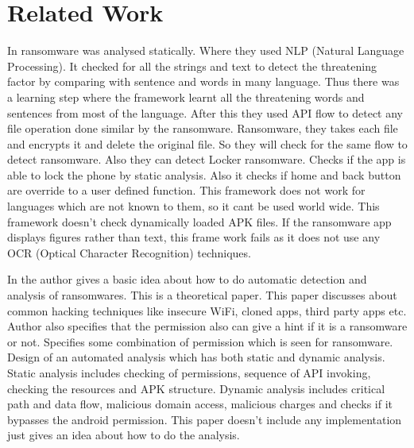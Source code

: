 \chapter{Related Work}


\par In \cite{andronio2015} ransomware was analysed statically. 
Where they used NLP (Natural Language Processing). 
It checked for all the strings and text to detect the threatening factor by comparing with sentence and words in many language. 
Thus there was a learning step where the framework learnt all the threatening words and sentences from most of the language. 
After this they used API flow to detect any file operation done similar by the ransomware. 
Ransomware, they takes each file and encrypts it and delete the original file. 
So they will check for the same flow to detect ransomware. 
Also they can detect Locker ransomware. 
Checks if the app is able to lock the phone by static analysis. 
Also it checks if home and back button are override to a user defined function. 
This framework does not work for languages which are not known to them, so it cant be used world wide. 
This framework doesn't check dynamically loaded APK files. 
If the ransomware app displays figures rather than text, this frame work fails as it does not use any OCR (Optical Character Recognition) techniques.


\par In \cite{yang2015} the author gives a basic idea about how to do automatic detection and analysis of ransomwares. 
This is a theoretical paper. 
This paper discusses about common hacking techniques like insecure WiFi, cloned apps, third party apps etc. 
Author also specifies that the permission also can give a hint if it is a ransomware or not. 
Specifies some combination of permission which is seen for ransomware. 
Design of an automated analysis which has both static and dynamic analysis. 
Static analysis includes checking of permissions, sequence of API invoking, checking the resources and APK structure.
Dynamic analysis includes critical path and data flow, malicious domain access, malicious charges and checks if it bypasses the android permission. 
This paper doesn't include any implementation just gives an idea about how to do the analysis.


